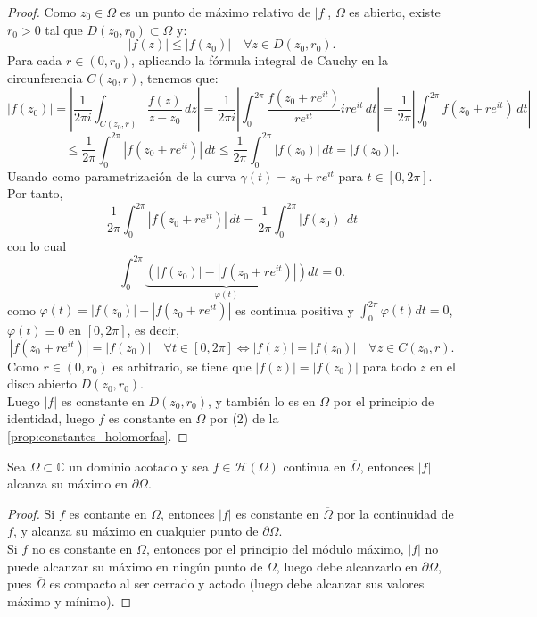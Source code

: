 \begin{proof}
    Como $z_0 \in \Omega$ es un punto de máximo relativo de $|f|$, $\Omega$ es abierto, existe $r_0 > 0$ tal que $D(z_0, r_0) \subset \Omega$ y:
    \[
        |f(z)| \leq |f(z_0)| \quad \forall z \in D(z_0, r_0).
    \]
    Para cada $r \in (0, r_0)$, aplicando la fórmula integral de Cauchy en la circunferencia $C(z_0, r)$, tenemos que:
    \[
        \left|f(z_0)\right| = \left| \frac{1}{2 \pi i} \int_{C(z_0, r)} \frac{f(z)}{z - z_0} \, dz \right| = \frac{1}{2 \pi i} \left| \int_{0}^{2 \pi} \frac{f(z_0 + r e^{i t})}{r e^{i t}} i r e^{i t} \, dt \right| = \frac{1}{2 \pi} \left| \int_{0}^{2 \pi} f(z_0 + r e^{i t}) \, dt \right| 
    \]
    \[
        \leq \frac{1}{2 \pi} \int_{0}^{2 \pi} |f(z_0 + r e^{i t})| \, dt \leq \frac{1}{2 \pi} \int_{0}^{2 \pi} |f(z_0)| \, dt = |f(z_0)|.
    \]
    Usando como parametrización de la curva $\gamma(t) = z_0 + r e^{i t}$ para $t \in [0, 2 \pi]$.\\
    Por tanto,
    \[
        \frac{1}{2 \pi} \int_{0}^{2 \pi} |f(z_0 + r e^{i t})| \, dt = \frac{1}{2 \pi} \int_{0}^{2 \pi} |f(z_0)| \, dt
    \]
    con lo cual
    \[
        \int_{0}^{2 \pi} \underbrace{ \left( |f(z_0)| - |f(z_0 + r e^{i t})| \right)}_{\varphi(t)} dt = 0.
    \]
    como $\varphi(t) = |f(z_0)| - |f(z_0 + r e^{i t})|$ es continua positiva y $\int_{0}^{2 \pi} \varphi(t) dt = 0$, $\varphi(t) \equiv 0$ en $[0, 2 \pi]$, es decir,
    \[
        |f(z_0 + r e^{i t})| = |f(z_0)| \quad \forall t \in [0, 2 \pi]
        \iff |f(z)| = |f(z_0)| \quad \forall z \in C(z_0, r).
    \]
    Como $r \in (0, r_0)$ es arbitrario, se tiene que $|f(z)| = |f(z_0)|$ para todo $z$ en el disco abierto $D(z_0, r_0)$.\\
    Luego $|f|$ es constante en $D(z_0, r_0)$, y también lo es en $\Omega$ por el principio de identidad, luego $f$ es constante en $\Omega$ por (2) de la \cref{prop:constantes_holomorfas}.
\end{proof}

\begin{corolario}
    Sea $\Omega \subset \mathbb{C}$ un dominio acotado y sea $f \in \mathcal{H}(\Omega)$ continua en $\overline{\Omega}$, entonces $|f|$ alcanza su máximo en $\partial \Omega$.
\end{corolario}

\begin{proof}
    Si $f$ es contante en $\Omega$, entonces $|f|$ es constante en $\overline{\Omega}$ por la continuidad de $f$, y alcanza su máximo en cualquier punto de $\partial \Omega$.\\
    Si $f$ no es constante en $\Omega$, entonces por el principio del módulo máximo, $|f|$ no puede alcanzar su máximo en ningún punto de $\Omega$, luego debe alcanzarlo en $\partial \Omega$, pues $\overline{\Omega}$ es compacto al ser cerrado y actodo (luego debe alcanzar sus valores máximo y mínimo).
\end{proof}

